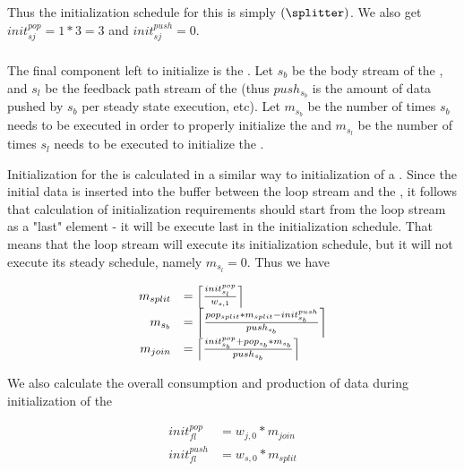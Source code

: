 Thus the initialization schedule for this {\splitjoin} is simply
$({\splitter})$.  We also get $init^{pop}_{sj} = 1
* 3 = 3$ and $init^{push}_{sj} = 0$.

\subsubsection{\feedbackloop}

The final {\StreamIt} component left to initialize is the
{\feedbackloop}. Let $s_b$ be the body stream of the {\feedbackloop},
and $s_l$ be the feedback path stream of the {\feedbackloop} (thus
$push_{s_b}$ is the amount of data pushed by $s_b$ per steady
state execution, etc).  Let $m_{s_b}$ be the number of times $s_b$
needs to be executed in order to properly initialize the
{\feedbackloop} and $m_{s_l}$ be the number of times $s_l$ needs to
be executed to initialize the {\feedbackloop}.

Initialization for the {\feedbackloop} is calculated in a similar
way to initialization of a {\pipeline}.  Since the initial data is
inserted into the buffer between the loop stream and the {\joiner},
it follows that calculation of initialization requirements should
start from the loop stream as a "last" element - it will be
execute last in the initialization schedule. That means that the
loop stream will execute its initialization schedule, but it will
not execute its steady schedule, namely $m_{s_l} = 0$.  Thus we
have

\begin{displaymath}
\begin{array}{rl}
m_{split} & = \left\lceil {init^{pop}_{s_l} \over w_{s,1}} \right\rceil \\
m_{s_b} & = \left\lceil pop_{split} * m_{split} -
init^{push}_{s_b} \over push_{s_b} \right\rceil \\
m_{join} & = \left\lceil init^{pop}_{s_b} + pop_{s_b} * m_{s_b}
\over { push_{s_b}} \right\rceil
\end{array}
\end{displaymath}

We also calculate the overall consumption and production of data
during initialization of the {\splitjoin}

\begin{displaymath}
\begin{array}{rl}
init^{pop}_{fl} & = w_{j,0} * m_{join} \\
init^{push}_{fl} & = w_{s, 0} * m_{split}
\end{array}
\end{displaymath}


